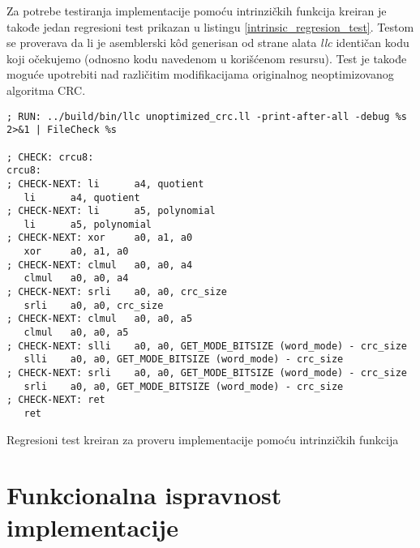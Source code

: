 \documentclass[12pt,oneside]{memoir}
\begin{document}
Za potrebe testiranja implementacije pomoću intrinzičkih funkcija kreiran je takođe jedan regresioni test prikazan u listingu \ref{intrinsic_regresion_test}.
Testom se proverava da li je asemblerski k\^od generisan od strane alata \textit{llc} identičan kodu koji očekujemo (odnosno kodu navedenom u korišćenom resursu). Test je takođe moguće upotrebiti nad različitim modifikacijama originalnog neoptimizovanog algoritma CRC.

\begin{listing}[!ht]
\begin{verbatim}
; RUN: ../build/bin/llc unoptimized_crc.ll -print-after-all -debug %s 2>&1 | FileCheck %s

; CHECK: crcu8: 
crcu8:  
; CHECK-NEXT: li      a4, quotient
   li      a4, quotient
; CHECK-NEXT: li      a5, polynomial
   li      a5, polynomial
; CHECK-NEXT: xor     a0, a1, a0
   xor     a0, a1, a0
; CHECK-NEXT: clmul   a0, a0, a4
   clmul   a0, a0, a4
; CHECK-NEXT: srli    a0, a0, crc_size
   srli    a0, a0, crc_size
; CHECK-NEXT: clmul   a0, a0, a5
   clmul   a0, a0, a5
; CHECK-NEXT: slli    a0, a0, GET_MODE_BITSIZE (word_mode) - crc_size
   slli    a0, a0, GET_MODE_BITSIZE (word_mode) - crc_size
; CHECK-NEXT: srli    a0, a0, GET_MODE_BITSIZE (word_mode) - crc_size
   srli    a0, a0, GET_MODE_BITSIZE (word_mode) - crc_size
; CHECK-NEXT: ret
   ret
\end{verbatim}
\caption{Regresioni test kreiran za proveru implementacije pomoću intrinzičkih funkcija}
\label{intrinsic_regresion_test}
\centering
\end{listing}

\section{Funkcionalna ispravnost implementacije}
\label{sec:rez_evaluacije}

\end{document}
